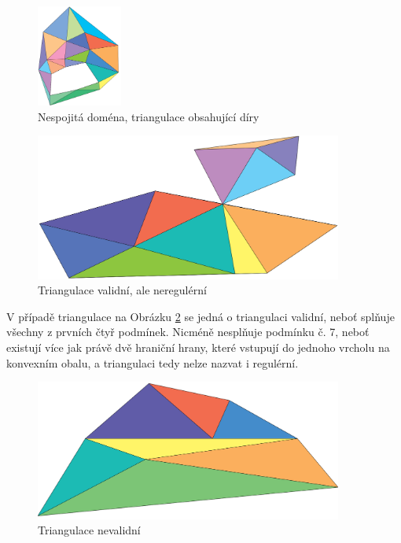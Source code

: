 \documentclass[12pt,a4paper]{article}
\begin{document}
\begin{figure}[h!]
\centering
\includegraphics[width=0.25\textwidth]{img/podm_domena.png}
\caption{Nespojitá doména, triangulace obsahující díry}
\label{fig:podm_domena}
\end{figure}

\begin{figure}[h!]
\centering
\includegraphics[width=0.9\textwidth]{img/vnr.png}
\caption{Triangulace validní, ale neregulérní}
\label{fig:trian_valid_not_reg}
\end{figure}

V případě triangulace na Obrázku \ref{fig:trian_valid_not_reg} se jedná o triangulaci validní, neboť splňuje všechny z prvních čtyř podmínek. Nicméně nesplňuje podmínku č. 7, neboť existují více jak právě dvě hraniční hrany, které vstupují do jednoho vrcholu na konvexním obalu, a triangulaci tedy nelze nazvat i regulérní.

\begin{figure}[h!]
\centering
\includegraphics[width=0.9\textwidth]{img/nv.png}
\caption{Triangulace nevalidní}
\label{fig:train_not_valid}
\end{figure}
\end{document}
